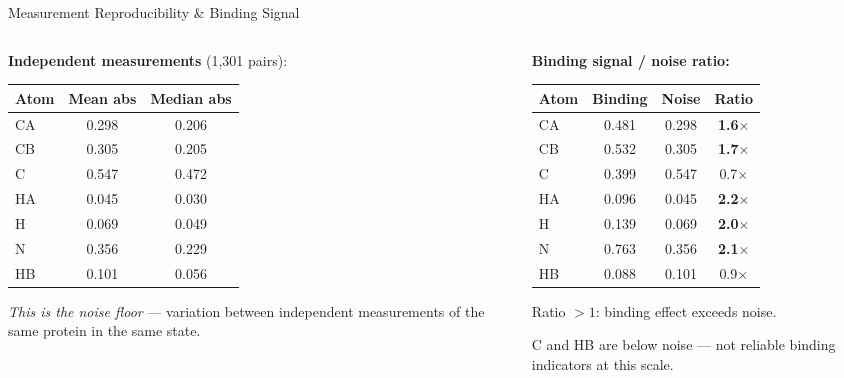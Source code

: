 \documentclass[aspectratio=169,11pt]{beamer}
\begin{document}
\begin{frame}[shrink=5]{Measurement Reproducibility \& Binding Signal}

\begin{columns}[T]
\begin{column}{0.52\textwidth}
\textbf{Independent measurements} (1,301 pairs):
\footnotesize

\medskip
\begin{tabular}{lcc}
\toprule
\textbf{Atom} & \textbf{Mean abs} & \textbf{Median abs} \\
\midrule
CA  & 0.298 & 0.206 \\
CB  & 0.305 & 0.205 \\
C   & 0.547 & 0.472 \\
HA  & 0.045 & 0.030 \\
H   & 0.069 & 0.049 \\
N   & 0.356 & 0.229 \\
HB  & 0.101 & 0.056 \\
\bottomrule
\end{tabular}

\smallskip
\normalsize
\textit{This is the noise floor} --- variation between independent measurements of the same protein in the same state.
\end{column}

\begin{column}{0.45\textwidth}
\textbf{Binding signal / noise ratio:}
\footnotesize

\medskip
\begin{tabular}{lccc}
\toprule
\textbf{Atom} & \textbf{Binding} & \textbf{Noise} & \textbf{Ratio} \\
\midrule
CA & 0.481 & 0.298 & \textbf{1.6$\times$} \\
CB & 0.532 & 0.305 & \textbf{1.7$\times$} \\
C  & 0.399 & 0.547 & 0.7$\times$ \\
HA & 0.096 & 0.045 & \textbf{2.2$\times$} \\
H  & 0.139 & 0.069 & \textbf{2.0$\times$} \\
N  & 0.763 & 0.356 & \textbf{2.1$\times$} \\
HB & 0.088 & 0.101 & 0.9$\times$ \\
\bottomrule
\end{tabular}

\smallskip
\normalsize
Ratio $>1$: binding effect exceeds noise.

\alert{C and HB are below noise} --- not reliable binding indicators at this scale.
\end{column}
\end{columns}
\end{frame}
\end{document}
